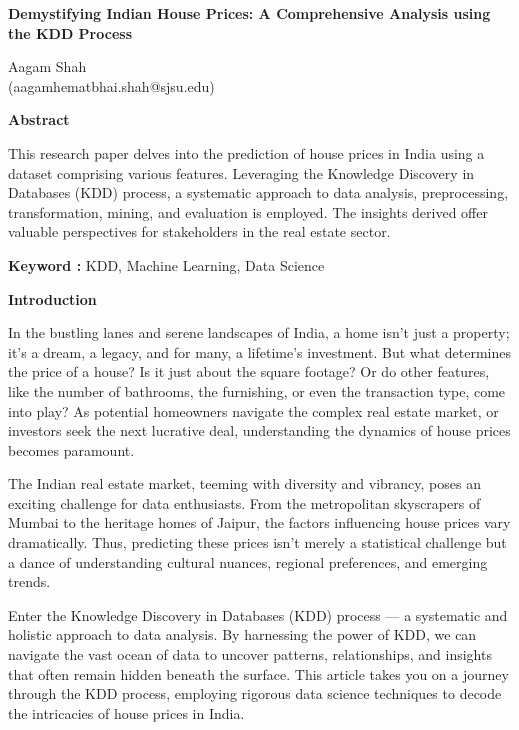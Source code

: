 \documentclass[]{article}
\newcommand{\textcenter}[1]{\begin{center} \vspace{10px}\textbf{\large #1} \end{center}}
\begin{document}
\begin{center}
    \textbf{\Large Demystifying Indian House Prices: A
Comprehensive Analysis using the KDD Process}

Aagam Shah\\
(aagamhematbhai.shah@sjsu.edu)
\end{center}

\vspace{14px}

\textcenter{Abstract}

This research paper delves into the prediction of house prices in India
using a dataset comprising various features. Leveraging the Knowledge
Discovery in Databases (KDD) process, a systematic approach to data
analysis, preprocessing, transformation, mining, and evaluation is
employed. The insights derived offer\\
valuable perspectives for stakeholders in the real estate sector.

\begin{center}
    \textbf{Keyword :} KDD, Machine Learning, Data Science
\end{center}

\textcenter{Introduction}

In the bustling lanes and serene landscapes of India, a home isn't just
a property; it's a dream, a legacy, and for many, a lifetime's
investment. But what determines the price of a house? Is it just about
the square footage? Or do other features, like the number of bathrooms,
the furnishing, or even the transaction type, come into play? As
potential homeowners navigate the complex real estate market, or
investors seek the next lucrative deal, understanding the dynamics of
house prices becomes paramount.

The Indian real estate market, teeming with diversity and vibrancy,
poses an exciting challenge for data enthusiasts. From the metropolitan
skyscrapers of Mumbai to the heritage homes of Jaipur, the factors
influencing house prices vary dramatically. Thus, predicting these
prices isn't merely a statistical challenge but a dance of understanding
cultural nuances, regional preferences, and emerging trends.

Enter the Knowledge Discovery in Databases (KDD) process --- a
systematic and holistic approach to data analysis. By harnessing the
power of KDD, we can navigate the vast ocean of data to uncover
patterns, relationships, and insights that often remain hidden beneath
the surface. This article takes you on a journey through the KDD
process, employing rigorous data science techniques to decode the
intricacies of house prices in India.
\end{document}
